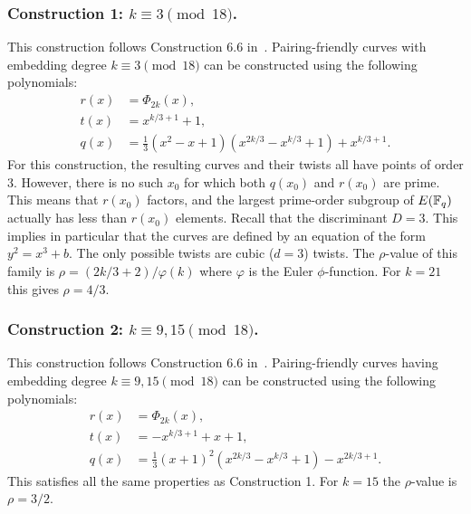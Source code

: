 
\subsubsection{Construction 1: $k \equiv 3 \pmod{18}$.}
\label{con1}

This construction follows {Construction 6.6} in~\cite{2010/freeman}.
Pairing-friendly curves with embedding degree $k \equiv 3 \pmod{18}$
can be constructed using the following polynomials:
\begin{align*}
r(x) &= \Phi_{2k}(x),	\\
t(x) &= x^{k/3+1} + 1,	\\
q(x) &= \frac{1}{3} (x^2 - x + 1) (x^{2k/3} - x^{k/3} + 1) + x^{k/3+1}.
\end{align*}
For this construction,
the resulting curves and their twists all have points of order 3.
However, there is no such $x_0$ for which
both $q(x_0)$ and $r(x_0)$ are prime.
This means that $r(x_0)$ factors, and the largest prime-order subgroup of $E(\mathbb{F}_{q})$ actually has less than $r(x_0)$ elements.
Recall that the discriminant $D = 3$. 
This implies in particular that the curves are defined by an equation of the form $y^2 = x^3 + b$.
The only possible twists are cubic ($d=3$) twists.
The $\rho$-value of this family is $\rho = (2k/3 + 2)/\varphi(k)$ where $\varphi$ is the Euler $\phi$-function.
For $k = 21$ this gives $\rho = 4/3$.


\subsubsection{Construction 2: $k \equiv 9,15 \pmod{18}$.}
\label{con2}

This construction follows {Construction 6.6} in~\cite{2010/freeman}.
Pairing-friendly curves having embedding degree $k \equiv 9,15 \pmod{18}$
can be constructed using the following polynomials:
\begin{align*}
r(x) &= \Phi_{2k}(x),	\\
t(x) &= -x^{k/3+1} + x + 1,	\\
q(x) &= \frac{1}{3} (x+1)^2 (x^{2k/3} - x^{k/3} + 1) - x^{2k/3+1}.
\end{align*}
This satisfies all the same properties as Construction 1.
For $k=15$ the $\rho$-value is $\rho=3/2$.

